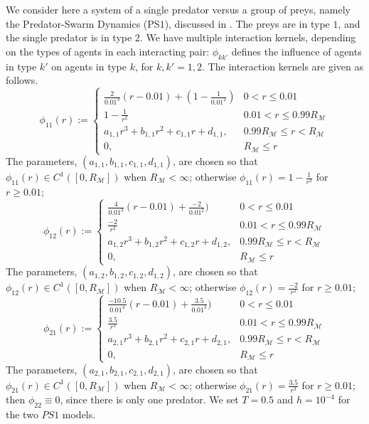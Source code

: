 \documentclass[11pt]{article}
\newcommand{\mM}{\mathcal{M}}
\newcommand{\IR}{R_{\mM}}
\newcommand{\idxcl}{k}
\newcommand{\intkernel}{\phi}
\begin{document}
We consider here a system of a single predator versus a group of preys, namely the Predator-Swarm Dynamics (PS$1$), discussed in \cite{CK2013}.  The preys are in type $1$, and the single predator is in type $2$.  We have multiple interaction kernels, depending on the types of agents in each interacting pair: $\intkernel_{\idxcl\idxcl'}$ defines the influence of agents in type $\idxcl'$ on agents in type $\idxcl$, for $\idxcl, \idxcl' = 1, 2$.  The interaction kernels are given as follows.
\[
\intkernel_{11}(r) := \left\{
        \begin{array}{ll}
            \frac{2}{0.01^3}(r - 0.01) + (1 - \frac{1}{0.01^2}) & 0 < r \le 0.01 \\
            1 - \frac{1}{r^2}                                   & 0.01 < r \le 0.99\IR \\
            a_{1, 1}r^3 + b_{1, 1}r^2 + c_{1, 1}r + d_{1, 1},   & 0.99\IR     \le r < \IR \\
            0,                                                  & \IR         \le r
        \end{array}
    \right.
\]
The parameters, $(a_{1, 1}, b_{1, 1}, c_{1, 1}, d_{1, 1})$, are chosen so that $\intkernel_{11}(r) \in C^1([0, \IR])$ when $\IR < \infty$; otherwise $\intkernel_{11}(r) = 1 - \frac{1}{r^2}$ for $r \ge 0.01$;
\[
\intkernel_{12}(r) := \left\{
        \begin{array}{ll}
            \frac{4}{0.01^3}(r - 0.01) + \frac{-2}{0.01^2})   & 0 < r \le 0.01 \\
            \frac{-2}{r^2}                                    & 0.01 < r \le 0.99\IR \\
            a_{1, 2}r^3 + b_{1, 2}r^2 + c_{1, 2}r + d_{1, 2}, & 0.99\IR     \le r < \IR \\
            0,                                                & \IR         \le r
        \end{array}
    \right.
\]
The parameters, $(a_{1, 2}, b_{1, 2}, c_{1, 2}, d_{1, 2})$, are chosen so that $\intkernel_{12}(r) \in C^1([0, \IR])$ when $\IR < \infty$; otherwise $\intkernel_{12}(r) = \frac{-2}{r^2}$ for $r \ge 0.01$;
\[
\intkernel_{21}(r) := \left\{
        \begin{array}{ll}
            \frac{-10.5}{0.01^4}(r - 0.01) + \frac{3.5}{0.01^3}) & 0 < r \le 0.01 \\
            \frac{3.5}{r^3}                                      & 0.01 < r \le 0.99\IR \\
            a_{2, 1}r^3 + b_{2, 1}r^2 + c_{2, 1}r + d_{2, 1},    & 0.99\IR     \le r < \IR \\
            0,                                                   & \IR         \le r
        \end{array}
    \right.
\]
The parameters, $(a_{2, 1}, b_{2, 1}, c_{2, 1}, d_{2, 1})$, are chosen so that $\intkernel_{21}(r) \in C^1([0, \IR])$ when $\IR < \infty$; otherwise $\intkernel_{21}(r) = \frac{3.5}{r^3}$ for $r \ge 0.01$; then $\intkernel_{22} \equiv 0$, since there is only one predator.  We set $T = 0.5$ and $h = 10^{-4}$ for the two $PS1$ models.
\end{document}
